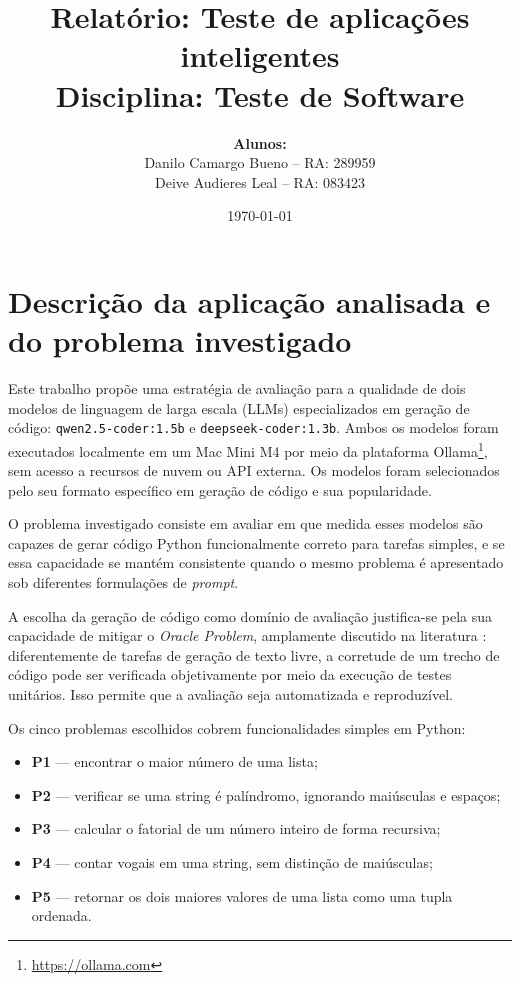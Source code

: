 \documentclass[12pt,
    english,
    french,
    spanish,
    brazil,
    ]{article}
\title{\textbf{Relatório: Teste de aplicações inteligentes} \\[0.5em]
\large{Disciplina: Teste de Software}}
\author{\textbf{Alunos:} \\
Danilo Camargo Bueno -- RA: 289959 \\
Deive Audieres Leal -- RA: 083423}
\date{\today}
\begin{document}
\maketitle
\thispagestyle{empty}
\vspace{2cm}

\tableofcontents
\newpage

\section{Descrição da aplicação analisada e do problema investigado}

Este trabalho propõe uma estratégia de avaliação para a qualidade de dois modelos de linguagem de larga escala (LLMs) especializados em geração de código: \texttt{qwen2.5-coder:1.5b} e \texttt{deepseek-coder:1.3b}. Ambos os modelos foram executados localmente em um Mac Mini M4 por meio da plataforma Ollama\footnote{\url{https://ollama.com}}, sem acesso a recursos de nuvem ou API externa. Os modelos foram selecionados pelo seu formato específico em geração de código e sua popularidade.

O problema investigado consiste em avaliar em que medida esses modelos são capazes de gerar código Python funcionalmente correto para tarefas simples, e se essa capacidade se mantém consistente quando o mesmo problema é apresentado sob diferentes formulações de \textit{prompt}.

A escolha da geração de código como domínio de avaliação justifica-se pela sua capacidade de mitigar o \textit{Oracle Problem}, amplamente discutido na literatura \cite{barr2015oracle}: diferentemente de tarefas de geração de texto livre, a corretude de um trecho de código pode ser verificada objetivamente por meio da execução de testes unitários. Isso permite que a avaliação seja automatizada e reproduzível.

Os cinco problemas escolhidos cobrem funcionalidades simples em Python:

\begin{itemize}
    \item \textbf{P1} — encontrar o maior número de uma lista;
    \item \textbf{P2} — verificar se uma string é palíndromo, ignorando maiúsculas e espaços;
    \item \textbf{P3} — calcular o fatorial de um número inteiro de forma recursiva;
    \item \textbf{P4} — contar vogais em uma string, sem distinção de maiúsculas;
    \item \textbf{P5} — retornar os dois maiores valores de uma lista como uma tupla ordenada.
\end{itemize}
\end{document}
